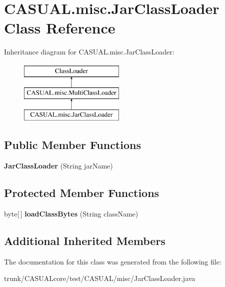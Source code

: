\hypertarget{classCASUAL_1_1misc_1_1JarClassLoader}{\section{C\-A\-S\-U\-A\-L.\-misc.\-Jar\-Class\-Loader Class Reference}
\label{classCASUAL_1_1misc_1_1JarClassLoader}
}
Inheritance diagram for C\-A\-S\-U\-A\-L.\-misc.\-Jar\-Class\-Loader\-:\begin{figure}[H]
\begin{center}
\leavevmode
\includegraphics[height=3.000000cm]{classCASUAL_1_1misc_1_1JarClassLoader}
\end{center}
\end{figure}
\subsection*{Public Member Functions}
\begin{DoxyCompactItemize}
\item 
\hypertarget{classCASUAL_1_1misc_1_1JarClassLoader_abe0e288f93e15f027d42ee33ae2c029b}{{\bfseries Jar\-Class\-Loader} (String jar\-Name)}\label{classCASUAL_1_1misc_1_1JarClassLoader_abe0e288f93e15f027d42ee33ae2c029b}

\end{DoxyCompactItemize}
\subsection*{Protected Member Functions}
\begin{DoxyCompactItemize}
\item 
\hypertarget{classCASUAL_1_1misc_1_1JarClassLoader_a7ddea315a610ec4cdaadea99d4c91801}{byte\mbox{[}$\,$\mbox{]} {\bfseries load\-Class\-Bytes} (String class\-Name)}\label{classCASUAL_1_1misc_1_1JarClassLoader_a7ddea315a610ec4cdaadea99d4c91801}

\end{DoxyCompactItemize}
\subsection*{Additional Inherited Members}


The documentation for this class was generated from the following file\-:\begin{DoxyCompactItemize}
\item 
trunk/\-C\-A\-S\-U\-A\-Lcore/test/\-C\-A\-S\-U\-A\-L/misc/Jar\-Class\-Loader.\-java\end{DoxyCompactItemize}
